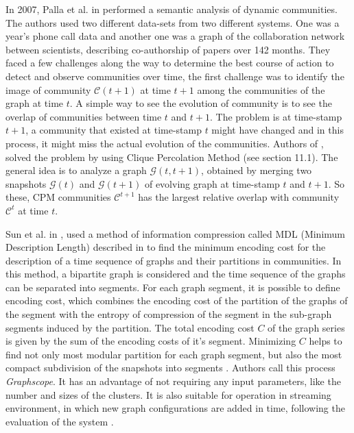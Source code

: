 In 2007, Palla et al. in \cite{ref-23} performed a semantic analysis of dynamic communities. The authors used two different data-sets from two different systems. One was a year's phone call data and another one was a graph of the collaboration network between scientists, describing co-authorship of papers over 142 months. They faced a few challenges along the way to determine the best course of action to detect and observe communities over time, the first challenge was to identify the image of community $\mathcal{C}(t+1)$ at time $t+1$ among the communities of the graph at time $t$. A simple way to see the evolution of community is to see the overlap of communities between time $t$ and $t+1$. The problem is at time-stamp $t+1$, a community that existed at time-stamp $t$ might have changed and in this process, it might miss the actual evolution of the communities. Authors of \cite{ref-23}, solved the problem by using Clique Percolation Method (see \cite{ref-6} section 11.1). The general idea is to analyze a graph $\mathcal{G}(t, t+1)$, obtained by merging two snapshots $\mathcal{G}(t)$ and $\mathcal{G}(t+1)$ of evolving graph at time-stamp $t$ and $t+1$. So these, CPM communities {$\mathcal{C}^{t+1}$} has the largest relative overlap with community {$\mathcal{C}^t$} at time $t$.

Sun et al. in \cite{ref-53}, used a method of information compression called MDL (Minimum Description Length) described in \cite{ref-54} to find the minimum encoding cost for the description of a time sequence of graphs and their partitions in communities. In this method, a bipartite graph is considered and the time sequence of the graphs can be separated into segments. For each graph segment, it is possible to define encoding cost, which combines the encoding cost of the partition of the graphs of the segment with the entropy of compression of the segment in the sub-graph segments induced by the partition. The total encoding cost $C$ of the graph series is given by the sum of the encoding costs of it's segment. Minimizing $C$ helps to find not only most modular partition for each graph segment, but also the most compact subdivision of the snapshots into segments \cite{ref-54}. Authors call this process \textit{Graphscope}. It has an advantage of not requiring any input parameters, like the number and sizes of the clusters. It is also suitable for operation in streaming environment, in which new graph configurations are added in time, following the evaluation of the system \cite{ref-53}.

